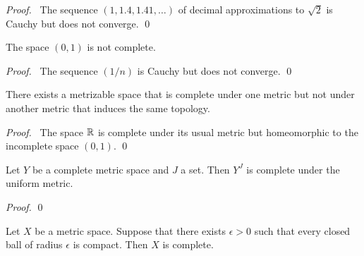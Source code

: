 \begin{proof}
    \pf\ The sequence $(1,1.4,1.41,\ldots)$ of decimal approximations to $\sqrt{2}$ is Cauchy but does not converge. \qed
\end{proof}

\begin{proposition}
    The space $(0,1)$ is not complete.
\end{proposition}

\begin{proof}
    \pf\ The sequence $(1/n)$ is Cauchy but does not converge. \qed
\end{proof}

\begin{corollary}
    There exists a metrizable space that is complete under one metric but not under another metric that induces the same topology.
\end{corollary}

\begin{proof}
    \pf\ The space $\mathbb{R}$ is complete under its usual metric but homeomorphic to the incomplete space $(0,1)$. \qed
\end{proof}

\begin{theorem}
    Let $Y$ be a complete metric space and $J$ a set. Then $Y^J$ is complete under the uniform metric.
\end{theorem}

\begin{proof}
    \pf
    \qed
\end{proof}

\begin{proposition}
    Let $X$ be a metric space. Suppose that there exists $\epsilon > 0$ such that every closed ball of radius $\epsilon$
    is compact. Then $X$ is complete.
\end{proposition}


